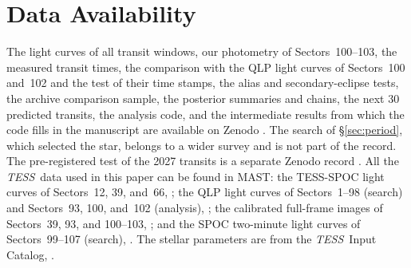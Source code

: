 \documentclass[twocolumn,linenumbers]{aastex701}
\newcommand{\tess}{\textit{TESS}}
\begin{document}
\section*{Data Availability}
The light curves of all transit windows, our photometry of Sectors~100--103, the measured transit times, the comparison with the QLP light curves of Sectors~100 and~102 and the test of their time stamps, the alias and secondary-eclipse tests, the archive comparison sample, the posterior summaries and chains, the next 30 predicted transits, the analysis code, and the intermediate results from which the code fills in the manuscript are available on Zenodo \citep[version 4.0; all versions: doi:10.5281/zenodo.23390273]{DataRecord}. The search of \S\ref{sec:period}, which selected the star, belongs to a wider survey and is not part of the record. The pre-registered test of the 2027 transits is a separate Zenodo record \citep{PreReg}. All the \tess\ data used in this paper can be found in MAST: the TESS-SPOC light curves of Sectors~12, 39, and~66, ; the QLP light curves of Sectors~1--98 (search) and Sectors~93, 100, and~102 (analysis), ; the calibrated full-frame images of Sectors~39, 93, and 100--103, ; and the SPOC two-minute light curves of Sectors~99--107 (search), . The stellar parameters are from the \tess\ Input Catalog, .

{}

\end{document}
